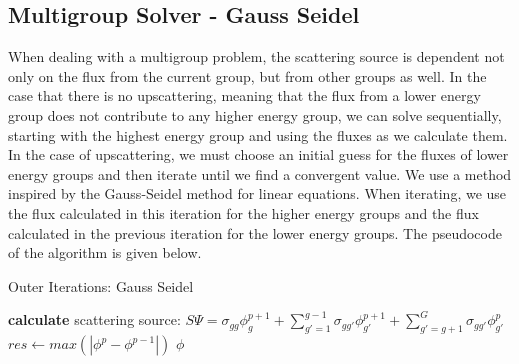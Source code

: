\subsection{Multigroup Solver - Gauss Seidel}
When dealing with a multigroup problem, the scattering source is dependent not only on the flux from the current group, but from other groups as well. In the case that there is no upscattering, meaning that the flux from a lower energy group does not contribute to any higher energy group, we can solve sequentially, starting with the highest energy group and using the fluxes as we calculate them. In the case of upscattering, we must choose an initial guess for the fluxes of lower energy groups and then iterate until we find a convergent value. We use a method inspired by the Gauss-Seidel method for linear equations. When iterating, we use the flux calculated in this iteration for the higher energy groups and the flux calculated in the previous iteration for the lower energy groups. The pseudocode of the algorithm is given below. 
\begin{algorithm}
\caption{Outer Iterations: Gauss Seidel}
\begin{algorithmic}
     
            \State \textbf{calculate} scattering source: \State $S\Psi = \sigma_{gg}\phi_g^{p+1} + \sum\limits_{g'=1}^{g-1} \sigma_{gg'} \phi_{g'}^{p+1} + \sum\limits_{g'=g+1}^G \sigma_{gg'}\phi_{g'}^p$
        \EndProcedure
        \EndFor
        \State $res \gets max(|\phi^{p} - \phi^{p-1}|)$  
        \EndWhile
    \Return $\phi$
\end{algorithmic}
\end{algorithm}


